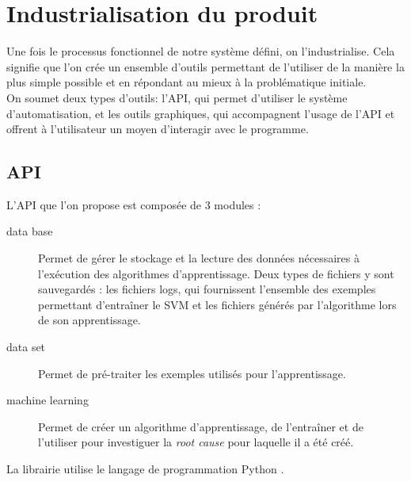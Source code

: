 \chapter{Industrialisation du produit}
\label{Industrialisation du produit}
\thispagestyle{fancy}
Une fois le processus fonctionnel de notre système défini, on l'industrialise. Cela signifie que l'on crée un ensemble d'outils permettant de l'utiliser de la manière la plus simple possible et en répondant au mieux à la problématique initiale. \\
On soumet deux types d'outils: l'API, qui permet d'utiliser le système d'automatisation, et les outils graphiques, qui accompagnent l'usage de l'API et offrent à l'utilisateur un moyen d'interagir avec le programme.  

\section{API}
\label{Industrialisation du produit: API}
L'API que l'on propose est composée de 3 modules :
\begin{description}
	\item [data base] Permet de gérer le stockage et la lecture des données nécessaires à l'exécution des algorithmes d'apprentissage. Deux types de fichiers y sont sauvegardés : les fichiers logs, qui fournissent l'ensemble des exemples permettant d'entraîner le SVM et les fichiers générés par l'algorithme lors de son apprentissage.
	\item [data set] Permet de pré-traiter les exemples utilisés pour l'apprentissage.
	\item [machine learning] Permet de créer un algorithme d'apprentissage, de l'entraîner et de l'utiliser pour investiguer la \emph{root cause} pour laquelle il a été créé.
\end{description}

La librairie utilise le langage de programmation Python \cite{Python}. \\

